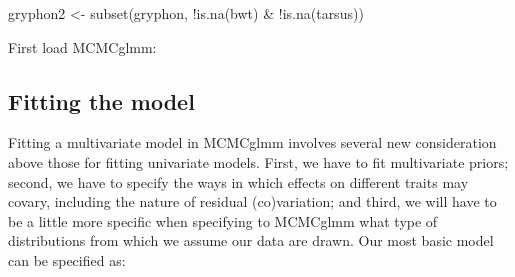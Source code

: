 \documentclass[
  12pt,
]{book}
\newenvironment{Shaded}{\begin{snugshade}}{\end{snugshade}}
\newcommand{\FunctionTok}[1]{\textcolor[rgb]{0.00,0.00,0.00}{#1}}
\newcommand{\NormalTok}[1]{#1}
\newcommand{\OtherTok}[1]{\textcolor[rgb]{0.56,0.35,0.01}{#1}}
\newcommand{\SpecialCharTok}[1]{\textcolor[rgb]{0.00,0.00,0.00}{#1}}
\begin{document}
\begin{Shaded}
\begin{Highlighting}[]
\NormalTok{gryphon2 }\OtherTok{\textless{}{-}} \FunctionTok{subset}\NormalTok{(gryphon, }\SpecialCharTok{!}\FunctionTok{is.na}\NormalTok{(bwt) }\SpecialCharTok{\&} \SpecialCharTok{!}\FunctionTok{is.na}\NormalTok{(tarsus))}
\end{Highlighting}
\end{Shaded}

First load MCMCglmm:

\begin{Shaded}
\end{Shaded}

\hypertarget{fitting-the-model}{%
\subsection{Fitting the model}\label{fitting-the-model}}

Fitting a multivariate model in MCMCglmm involves several new consideration above those for fitting univariate models. First, we have to fit multivariate priors; second, we have to specify the ways in which effects on different traits may covary, including the nature of residual (co)variation; and third, we will have to be a little more specific when specifying to MCMCglmm what type of distributions from which we assume our data are drawn. Our most basic model can be specified as:
\end{document}
